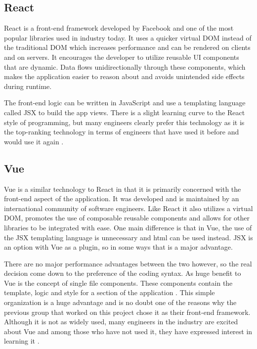 \documentclass[draftclsnofoot,onecolumn,journal,letterpaper,compsoc,10pt]{IEEEtran}
\begin{document}
        \subsection{React}
        React is a front-end framework developed by Facebook and one of the most popular libraries used in industry today. It uses a quicker virtual DOM instead of the traditional DOM which increases performance and can be rendered on clients and on servers. It encourages the developer to utilize reusable UI components that are dynamic. Data flows unidirectionally through these components, which makes the application easier to reason about and avoids unintended side effects during runtime. 
        
        The front-end logic can be written in JavaScript and use a templating language called JSX to build the app views. There is a slight learning curve to the React style of programming, but many engineers clearly prefer this technology as it is the top-ranking technology in terms of engineers that have used it before and would use it again \cite{stateofjs2017}.

        \subsection{Vue}
        Vue is a similar technology to React in that it is primarily concerned with the front-end aspect of the application. It was developed and is maintained by an international community of software engineers. Like React it also utilizes a virtual DOM, promotes the use of composable reusable components and allows for other libraries to be integrated with ease. One main difference is that in Vue, the use of the JSX templating language is unnecessary and html can be used instead. JSX is an option with Vue as a plugin, so in some ways that is a major advantage. 
        
        There are no major performance advantages between the two however, so the real decision come down to the preference of the coding syntax. As huge benefit to Vue is the concept of single file components. These components contain the template, logic and style for a section of the application \cite{vue}. This simple organization is a huge advantage and is no doubt one of the reasons why the previous group that worked on this project chose it as their front-end framework. Although it is not as widely used, many engineers in the industry are excited about Vue and among those who have not used it, they have expressed interest in learning it \cite{stateofjs2017}.
\end{document}
